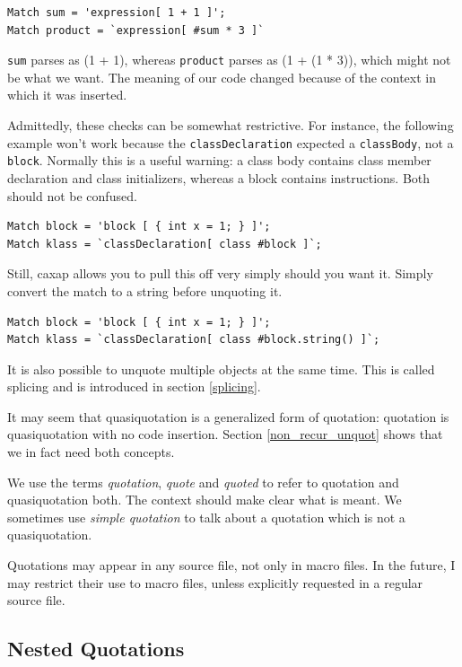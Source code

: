 \begin{lstlisting}
Match sum = 'expression[ 1 + 1 ]';
Match product = `expression[ #sum * 3 ]`
\end{lstlisting}

\texttt{sum} parses as (1 + 1), whereas \texttt{product} parses as (1 + (1 *
3)), which might not be what we want. The meaning of our code changed because of
the context in which it was inserted.

Admittedly, these checks can be somewhat restrictive. For instance, the
following example won't work because the \texttt{classDeclaration} expected a
\texttt{classBody}, not a \texttt{block}. Normally this is a useful warning: a
class body contains class member declaration and class initializers, whereas a
block contains instructions. Both should not be confused.

\begin{lstlisting}
Match block = 'block [ { int x = 1; } ]';
Match klass = `classDeclaration[ class #block ]`;
\end{lstlisting}

Still, caxap allows you to pull this off very simply should you want it. Simply
convert the match to a string before unquoting it.

\begin{lstlisting}
Match block = 'block [ { int x = 1; } ]';
Match klass = `classDeclaration[ class #block.string() ]`;
\end{lstlisting}

It is also possible to unquote multiple objects at the same time. This is called
splicing and is introduced in section \ref{splicing}.

It may seem that quasiquotation is a generalized form of quotation: quotation is
quasiquotation with no code insertion. Section \ref{non_recur_unquot} shows that
we in fact need both concepts.

We use the terms \emph{quotation}, \emph{quote} and \emph{quoted} to refer to
quotation and quasiquotation both. The context should make clear what is
meant. We sometimes use \emph{simple quotation} to talk about a quotation which
is not a quasiquotation.

Quotations may appear in any source file, not only in macro files. In the
future, I may restrict their use to macro files, unless explicitly requested in
a regular source file.

\subsection{Nested Quotations}
\label{nested_quot}

